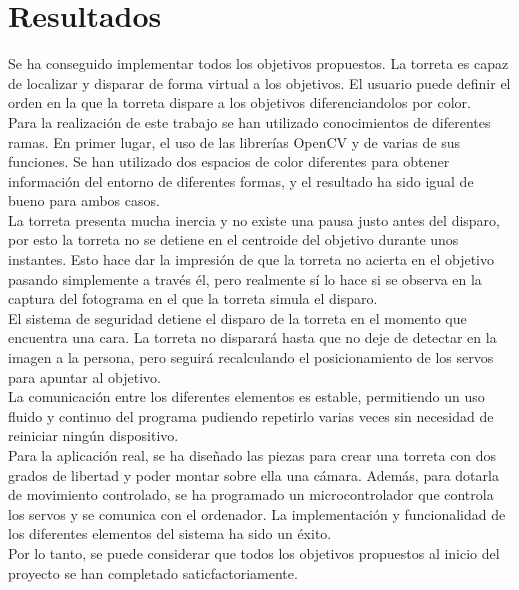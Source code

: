 \section{Resultados}
Se ha conseguido implementar todos los objetivos propuestos. La torreta es capaz de localizar y disparar de forma virtual a los objetivos. El usuario puede definir el orden en la que la torreta dispare a los objetivos diferenciandolos por color.\\

Para la realización de este trabajo se han utilizado conocimientos de diferentes ramas. En primer lugar, el uso de las librerías OpenCV y de varias de sus funciones. Se han utilizado dos espacios de color diferentes para obtener información del entorno de diferentes formas, y el resultado ha sido igual de bueno para ambos casos.\\

La torreta presenta mucha inercia y no existe una pausa justo antes del disparo, por esto la torreta no se detiene en el centroide del objetivo durante unos instantes. Esto hace dar la impresión de que la torreta no acierta en el objetivo pasando simplemente a través él, pero realmente sí lo hace si se observa en la captura del fotograma en el que la torreta simula el disparo.\\

El sistema de seguridad detiene el disparo de la torreta en el momento que encuentra una cara. 
La torreta no disparará hasta que no deje de detectar en la imagen a la persona, pero seguirá recalculando el posicionamiento de los servos para apuntar al objetivo.\\

La comunicación entre los diferentes elementos es estable, permitiendo un uso fluido y continuo del programa pudiendo repetirlo varias veces sin necesidad de reiniciar ningún dispositivo.\\

Para la aplicación real, se ha diseñado las piezas para crear una torreta con dos grados de libertad y poder montar sobre ella una cámara. Además, para dotarla de movimiento controlado, se ha programado un microcontrolador que controla los servos y se comunica con el ordenador. La implementación y funcionalidad de los diferentes elementos del sistema ha sido un éxito.\\

Por lo tanto, se puede considerar que todos los objetivos propuestos al inicio del proyecto se han completado saticfactoriamente.\\



